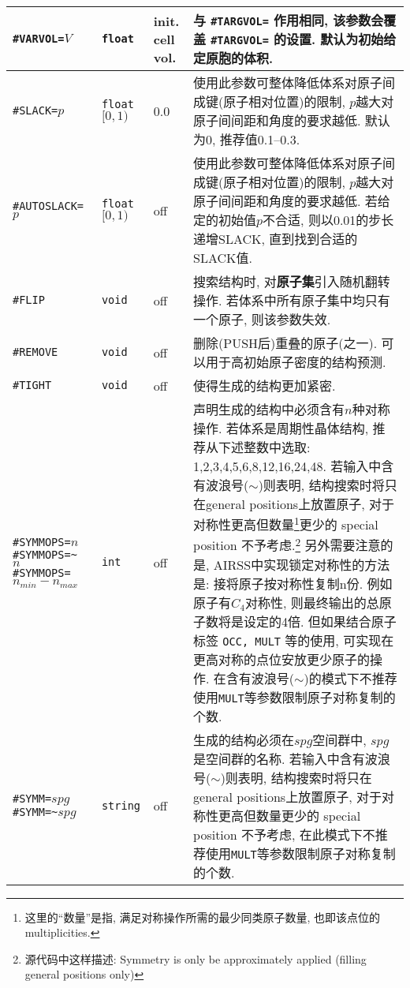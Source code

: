 \documentclass[a4paper, 10pt]{article}
\begin{document}
\begin{center}
\begin{longtable}{m{11em}|m{4em}<{\centering}|m{3em}<{\centering}|m{15em}}
\midrule
\verb|#VARVOL=|\(V\)& \verb|float| & init. cell vol. & 与 \verb|#TARGVOL=| 作用相同, 该参数会覆盖 \verb|#TARGVOL=| 的设置. 默认为初始给定原胞的体积.\\
\midrule
\verb|#SLACK=|\(p\)& \verb|float| \([0,1)\) & 0.0 & 使用此参数可整体降低体系对原子间成键(原子相对位置)的限制, \(p\)越大对原子间间距和角度的要求越低. 默认为0, 推荐值0.1--0.3.\\
\midrule
\verb|#AUTOSLACK=|\(p\)& \verb|float| \([0,1)\) & off & 使用此参数可整体降低体系对原子间成键(原子相对位置)的限制, \(p\)越大对原子间间距和角度的要求越低. 若给定的初始值\(p\)不合适, 则以0.01的步长递增SLACK, 直到找到合适的SLACK值.\\
\midrule
\verb|#FLIP|& \verb|void| & off & 搜索结构时, 对\textbf{原子集}引入随机翻转操作. 若体系中所有原子集中均只有一个原子, 则该参数失效.\\
\midrule
\verb|#REMOVE|& \verb|void| & off & 删除(PUSH后)重叠的原子(之一). 可以用于高初始原子密度的结构预测.\\
\midrule
\verb|#TIGHT|& \verb|void| & off & 使得生成的结构更加紧密.\\
\midrule
\verb|#SYMMOPS=|\(n\)\hspace{6em}\verb|#SYMMOPS=~|\(n\;\;\;\;\;\;\;\;\;\;\;\)\hspace{6em}\verb|#SYMMOPS=|\(n_{min}-n_{max}\) & \verb|int| &  off & 声明生成的结构中必须含有\(n\)种对称操作. 若体系是周期性晶体结构, 推荐从下述整数中选取: 1,2,3,4,5,6,8,12,16,24,48. 若输入中含有波浪号(\(\sim\))则表明, 结构搜索时将只在general positions上放置原子, 对于对称性更高但数量\footnote{这里的``数量''是指, 满足对称操作所需的最少同类原子数量, 也即该点位的 multiplicities. }更少的 special position 不予考虑.\footnote{源代码中这样描述: Symmetry is only be approximately applied (filling general positions only)} 另外需要注意的是, AIRSS中实现锁定对称性的方法是: 接将原子按对称性复制n份. 例如原子有\(C_4\)对称性, 则最终输出的总原子数将是设定的4倍. 但如果结合原子标签 \verb|OCC, MULT| 等的使用, 可实现在更高对称的点位安放更少原子的操作. 在含有波浪号(\(\sim\))的模式下不推荐使用\verb|MULT|等参数限制原子对称复制的个数.\\
\midrule
\verb|#SYMM=|\(spg\)\hspace{6em} \verb|#SYMM=~|\(spg\)& \verb|string| & off & 生成的结构必须在\(spg\)空间群中, \(spg\)是空间群的名称. 若输入中含有波浪号(\(\sim\))则表明, 结构搜索时将只在general positions上放置原子, 对于对称性更高但数量更少的 special position 不予考虑, 在此模式下不推荐使用\verb|MULT|等参数限制原子对称复制的个数.\\
\midrule

\end{longtable}
\end{center}
\end{document}
